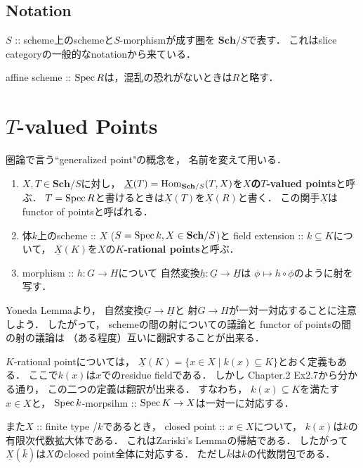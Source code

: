\documentclass[a4paper]{jsarticle}
\newcommand{\Sch}{\mathbf{Sch}}
\newcommand{\func}[1]{\underline{#1}}
\begin{document}
\subsection*{Notation}
    $S$ :: scheme上のschemeと$S$-morphismが成す圏を
    \textbf{$\Sch/S$}で表す．
    これはslice categoryの一般的なnotationから来ている．
    
    affine scheme :: $\operatorname{Spec} R$は，混乱の恐れがないときは$R$と略す．

\section{$T$-valued Points}
    圏論で言う``generalized point"の概念を，
    名前を変えて用いる．

    \begin{Def}
    \enumfix
    \begin{enumerate}[label=(\roman*),leftmargin=*]
    \item 
    $X, T \in \Sch/S$に対し，
    $\func{X}(T)=\Hom_{\Sch/S}(T,X)$を\textbf{$X$の$T$-valued points}と呼ぶ．
    $T=\operatorname{Spec} R$と書けるときは$\func{X}(T)$を$\func{X}(R)$と書く．
    この関手$\func{X}$はfunctor of pointsと呼ばれる．

    \item
    体$k$上のscheme :: $X$ ($S=\Spec k, X \in \Sch/S$)と
    field extension :: $k \subseteq K$について，
    $\func{X}(K)$を$X$の\textbf{$K$-rational points}と呼ぶ．

    \item
    morphism :: $h: G \to H$について
    自然変換$\func{h}: \func{G} \to \func{H}$は
    $\phi \mapsto h \circ \phi$のように射を写す．
    \end{enumerate}
    \end{Def}

    \begin{Remark}
        Yoneda Lemmaより，
        自然変換$\func{G} \to \func{H}$と
        射$G \to H$が一対一対応することに注意しよう．
        したがって，
        schemeの間の射についての議論と
        functor of pointsの間の射の議論は
        （ある程度）互いに翻訳することが出来る．
    \end{Remark}

    \begin{Remark}
        $K$-rational pointについては，
        $\func{X}(K)=\{ x \in X \mid k(x) \subseteq K \}$とおく定義もある．
        ここで$k(x)$は$x$でのresidue fieldである．
        しかし\cite{HarAG} Chapter.2 Ex2.7から分かる通り，
        この二つの定義は翻訳が出来る．
        すなわち，
        $k(x) \subseteq K$を満たす$x \in X$と，
        $\operatorname{Spec} k$-morpsihm :: $\operatorname{Spec} K \to X$は一対一に対応する．

        また$X$ :: finite type /$k$であるとき，
        closed point :: $x \in X$について，
        $k(x)$は$k$の有限次代数拡大体である．
        これはZariski's Lemmaの帰結である．
        したがって$\func{X}(\bar{k})$は$X$のclosed point全体に対応する．
        ただし$\bar{k}$は$k$の代数閉包である．
    \end{Remark}
\end{document}
